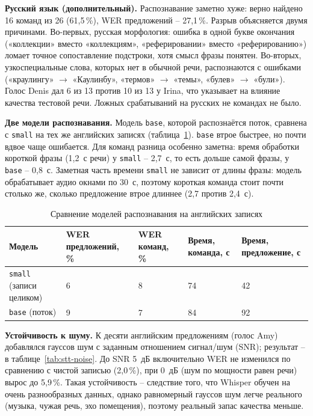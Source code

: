 \textbf{Русский язык (дополнительный).} Распознавание заметно хуже:
верно найдено 16 команд из 26 (61{,}5\,\%), WER предложений -- 27{,}1\,\%.
Разрыв объясняется двумя причинами. Во-первых, русская морфология: ошибка
в одной букве окончания («коллекции» вместо «коллекциям»,
«реферировании» вместо «реферированию») ломает точное
сопоставление подстроки, хотя смысл фразы понятен. Во-вторых, узкоспециальные
слова, которых нет в обычной речи, распознаются с ошибками
(«краулингу» $\to$ «Каулинбу», «термов» $\to$ «темы», «булев» $\to$
«були»). Голос Denis дал 6 из 13 против 10 из 13 у Irina, что указывает
на влияние качества тестовой речи. Ложных срабатываний на русских
не командах не было.

\textbf{Две модели распознавания.} Модель \texttt{base}, которой
распознаётся поток, сравнена с \texttt{small} на тех же английских
записях (таблица~\ref{tab:stt-models}). \texttt{base} втрое быстрее, но
почти вдвое чаще ошибается. Для команд разница особенно заметна:
время обработки короткой фразы (1{,}2~с речи) у \texttt{small} -- 2{,}7~с,
то есть дольше самой фразы, у \texttt{base} -- 0{,}8~с. Заметная часть времени
\texttt{small} не зависит от длины фразы: модель обрабатывает аудио
окнами по 30~с, поэтому короткая команда стоит почти столько же, сколько
предложение втрое длиннее (2{,}7 против 2{,}4~с).

\begin{table}[H]
  \centering
  \caption{Сравнение моделей распознавания на английских записях}
  \label{tab:stt-models}
  \small
  \begin{tabular}{|>{\raggedright\arraybackslash}p{}|>{\raggedright\arraybackslash}p{}|>{\raggedright\arraybackslash}p{}|>{\raggedright\arraybackslash}p{}|>{\raggedright\arraybackslash}p{}|}
    \hline
    Модель & WER предложений, \% & WER команд, \% & Время, команда, с & Время, предложение, с \\
    \hline
    \texttt{small} (записи целиком) & 2{,}6 & 3{,}8 & 2{,}74 & 2{,}42 \\
    \hline
    \texttt{base} (поток) & 4{,}9 & 7{,}7 & 0{,}84 & 0{,}92 \\
    \hline
  \end{tabular}
\end{table}

\textbf{Устойчивость к шуму.} К десяти английским предложениям (голос
Amy) добавлялся гауссов шум с заданным отношением сигнал/шум (SNR);
результат -- в таблице~\ref{tab:stt-noise}. До SNR 5~дБ включительно
WER не изменился по сравнению с чистой записью (2{,}0\,\%), при 0~дБ
(шум по мощности равен речи) вырос до 5{,}9\,\%. Такая устойчивость --
следствие того, что Whisper обучен на очень разнообразных
данных, однако равномерный гауссов шум легче реального (музыка,
чужая речь, эхо помещения), поэтому реальный запас качества меньше.

